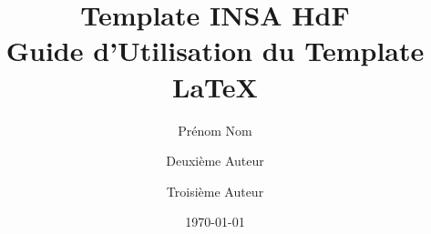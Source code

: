 \def\projecttitle{Guide d'Utilisation du Template \LaTeX}
\def\projecticonl{1_cover/meta/insa.pdf} %
\def\projecticonr{1_cover/meta/uphf.pdf}       %

\title{
    \vspace{1.5cm}Template INSA HdF \\ 
    \vspace{0.25cm} \LARGE{\textbf{\projecttitle}}
}

\author[1]{Prénom Nom}
\author[2]{Deuxième Auteur}
\author[3]{Troisième Auteur}


\date{\today}

\def\tutors{
    \addtutor{PrénomTuteur}{NomTuteur}{adressetutor@etablissement.fr}
}

\def\varkeywords{
    LaTeX, Template, Guide d'utilisation, Overleaf, Structure de projet, 
    Fichiers de configuration, Packages, Commandes personnalisées, 
    Variables globales, Mise en page, En-têtes et pieds de page, 
    Figures et images, Tableaux, Graphiques, TikZ, PGFPlots, 
    Bibliographie, BibTeX, Références, Documentation, Ingénierie collaborative, 
    Rédaction scientifique, Document technique.
}